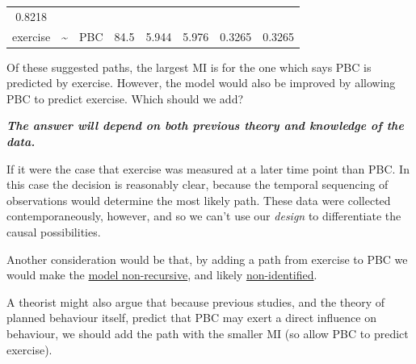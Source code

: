 \documentclass[]{article}
\theoremstyle{definition}
\theoremstyle{definition}
\theoremstyle{definition}
\theoremstyle{remark}
\begin{document}
\begin{longtable}[]{@{}cccccccc@{}}
\begin{minipage}[t]{0.11\columnwidth}
0.8218\strut
\end{minipage}\tabularnewline
\begin{minipage}[t]{0.11\columnwidth}\centering\strut
exercise\strut
\end{minipage} & \begin{minipage}[t]{0.05\columnwidth}\centering\strut
\textasciitilde{}\strut
\end{minipage} & \begin{minipage}[t]{0.11\columnwidth}\centering\strut
PBC\strut
\end{minipage} & \begin{minipage}[t]{0.08\columnwidth}\centering\strut
84.5\strut
\end{minipage} & \begin{minipage}[t]{0.10\columnwidth}\centering\strut
5.944\strut
\end{minipage} & \begin{minipage}[t]{0.10\columnwidth}\centering\strut
5.976\strut
\end{minipage} & \begin{minipage}[t]{0.11\columnwidth}\centering\strut
0.3265\strut
\end{minipage} & \begin{minipage}[t]{0.11\columnwidth}\centering\strut
0.3265\strut
\end{minipage}\tabularnewline
\bottomrule
\end{longtable}

Of these suggested paths, the largest MI is for the one which says PBC
is predicted by exercise. However, the model would also be improved by
allowing PBC to predict exercise. Which should we add?

\textbf{\emph{The answer will depend on both previous theory and
knowledge of the data.}}

If it were the case that exercise was measured at a later time point
than PBC. In this case the decision is reasonably clear, because the
temporal sequencing of observations would determine the most likely
path. These data were collected contemporaneously, however, and so we
can't use our \emph{design} to differentiate the causal possibilities.

Another consideration would be that, by adding a path from exercise to
PBC we would make the \protect\hyperlink{identification-recursion}{model
non-recursive}, and likely
\protect\hyperlink{identification}{non-identified}.

A theorist might also argue that because previous studies, and the
theory of planned behaviour itself, predict that PBC may exert a direct
influence on behaviour, we should add the path with the smaller MI (so
allow PBC to predict exercise).
\end{document}
